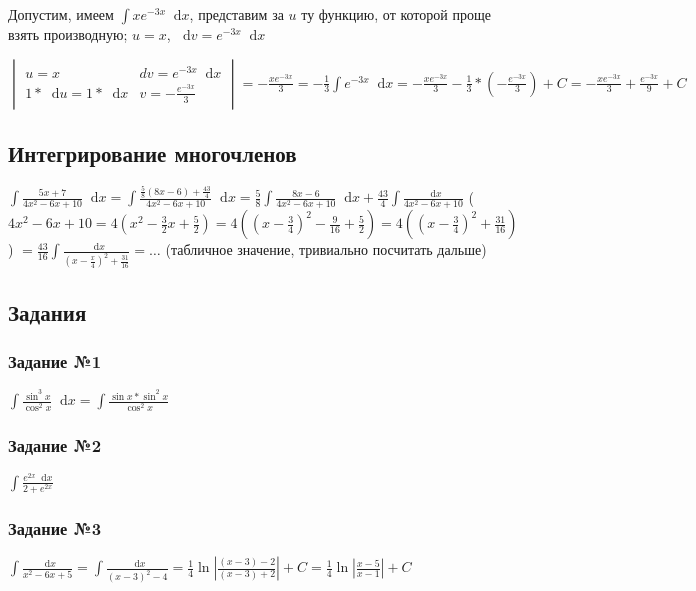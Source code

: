 \documentclass{article}
\newcommand*\diff{\mathop{}\!\mathrm{d}}
\begin{document}
Допустим, имеем $\int x e^{-3 x} \diff x$, представим за $u$ ту функцию, от которой проще взять производную; $u = x$, $\diff v = e^{- 3 x} \diff x$

$\begin{vmatrix}
    u = x & dv = e^{- 3 x} \diff x \\
    1 * \diff u = 1 * \diff x & v = - \frac{e^{- 3 x}}{3}
\end{vmatrix} = - \frac{x e^{- 3 x}}{3} = -\frac{1}{3} \int e^{- 3 x} \diff x = - \frac{x e^{-3 x}}{3} - \frac{1}{3} * (-\frac{e^{- 3 x}}{3}) + C = -\frac{x e^{- 3 x}}{3} + \frac{e^{- 3 x}}{9} + C$

\subsection{Интегрирование многочленов}

$
\int \frac{5 x + 7}{4x^2 - 6x + 10} \diff x = \int \frac{\frac{5}{8} (8x - 6) + \frac{43}{4}}{4x^2 - 6x + 10} \diff x = \frac{5}{8} \int \frac{8x - 6}{4x^2 - 6x + 10} \diff x + \frac{43}{4} \int \frac{\diff x}{4x^2 - 6x + 10}
$
($4x^2 - 6x + 10 = 4 (x^2 - \frac{3}{2} x + \frac{5}{2}) = 4((x - \frac{3}{4})^2 - \frac{9}{16} + \frac{5}{2}) = 4((x - \frac{3}{4})^2 + \frac{31}{16})$)
$
= \frac{43}{16} \int \frac{\diff x}{(x - \frac{x}{4})^2 + \frac{31}{16}} = \dots
$ (табличное значение, тривиально посчитать дальше)

\subsection{Задания}

\subsubsection{Задание №1}

$\int \frac{\sin^3 x}{\cos^2 x} \diff x = \int \frac{\sin x * \sin^2 x}{\cos^2 x}$

\subsubsection{Задание №2}

$\int \frac{e^{2 x} \diff x}{2 + e^{2 x}}$

\subsubsection{Задание №3}

$
\int \frac{\diff x}{x^2 - 6x + 5} = \int \frac{\diff x}{(x - 3)^2 - 4}
= \frac{1}{4} \ln | \frac{(x - 3) - 2}{(x - 3) + 2} | + C = \frac{1}{4} \ln | \frac{x - 5}{x - 1} | + C
$
\end{document}
